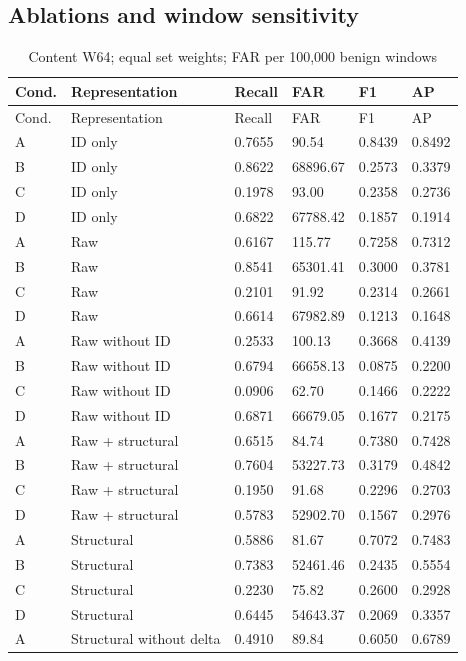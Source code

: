 \documentclass[12pt,a4paper,oneside,openany]{extbook}
\begin{document}
\subsection{Ablations and window sensitivity}
\begin{longtable}{P{1.1cm}P{4.2cm}P{1.6cm}P{2.2cm}P{1.6cm}P{1.6cm}}
\caption{Content W64; equal set weights; FAR per 100,000 benign windows}\label{tab:extension-w64}\\\toprule
Cond. & Representation & Recall & FAR & F1 & AP\\\midrule\endfirsthead
\toprule
Cond. & Representation & Recall & FAR & F1 & AP\\\midrule\endhead
A & ID only & 0.7655 & 90.54 & 0.8439 & 0.8492\\
B & ID only & 0.8622 & 68896.67 & 0.2573 & 0.3379\\
C & ID only & 0.1978 & 93.00 & 0.2358 & 0.2736\\
D & ID only & 0.6822 & 67788.42 & 0.1857 & 0.1914\\
A & Raw & 0.6167 & 115.77 & 0.7258 & 0.7312\\
B & Raw & 0.8541 & 65301.41 & 0.3000 & 0.3781\\
C & Raw & 0.2101 & 91.92 & 0.2314 & 0.2661\\
D & Raw & 0.6614 & 67982.89 & 0.1213 & 0.1648\\
A & Raw without ID & 0.2533 & 100.13 & 0.3668 & 0.4139\\
B & Raw without ID & 0.6794 & 66658.13 & 0.0875 & 0.2200\\
C & Raw without ID & 0.0906 & 62.70 & 0.1466 & 0.2222\\
D & Raw without ID & 0.6871 & 66679.05 & 0.1677 & 0.2175\\
A & Raw + structural & 0.6515 & 84.74 & 0.7380 & 0.7428\\
B & Raw + structural & 0.7604 & 53227.73 & 0.3179 & 0.4842\\
C & Raw + structural & 0.1950 & 91.68 & 0.2296 & 0.2703\\
D & Raw + structural & 0.5783 & 52902.70 & 0.1567 & 0.2976\\
A & Structural & 0.5886 & 81.67 & 0.7072 & 0.7483\\
B & Structural & 0.7383 & 52461.46 & 0.2435 & 0.5554\\
C & Structural & 0.2230 & 75.82 & 0.2600 & 0.2928\\
D & Structural & 0.6445 & 54643.37 & 0.2069 & 0.3357\\
A & Structural without delta & 0.4910 & 89.84 & 0.6050 & 0.6789\\

\end{longtable}
\end{document}
